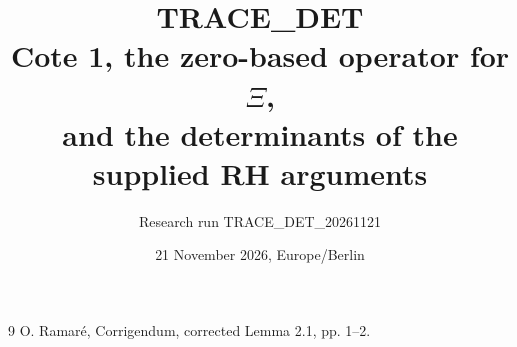 \documentclass[11pt,a4paper]{article}
\title{\textbf{TRACE\_DET}\\Cote 1, the zero-based operator for $\Xi$,\\and the determinants of the supplied RH arguments}
\author{Research run TRACE\_DET\_20261121}
\date{21 November 2026, Europe/Berlin}
\begin{document}

\begin{thebibliography}{9}
 O. Ramar\'e, Corrigendum, corrected Lemma 2.1, pp. 1--2.
\end{thebibliography}
\end{document}
